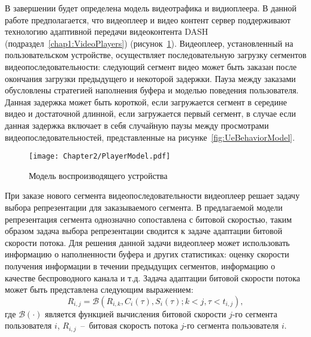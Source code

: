 В завершении будет определена модель видеотрафика и видиоплеера. В данной работе предполагается, что видеоплеер и видео контент сервер поддерживают технологию адаптивной передачи видеоконтента DASH (подраздел~\ref{chap1:VideoPlayers}) (рисунок~\ref{fig:PlayerModel}). Видеоплеер, установленный на пользовательском устройстве, осуществляет последовательную загрузку сегментов видеопоследовательности: следующий сегмент видео может быть заказан после окончания загрузки предыдущего и некоторой задержки. Пауза между заказами обусловлены стратегией наполнения буфера и моделью поведения пользователя. Данная задержка может быть короткой, если загружается сегмент в середине видео и достаточной длинной, если загружается первый сегмент, в случае если данная задержка включает в себя случайную паузы между просмотрами видеопоследовательностей, представленные на рисунке~\ref{fig:UeBehaviorModel}.

\begin{figure}[htbp]
\begin{center}
\texttt{[image: Chapter2/PlayerModel.pdf]}
\caption{Модель воспроизводящего устройства}
\label{fig:PlayerModel}
\end{center}
\end{figure}

При заказе нового сегмента видеопоследовательности видеоплеер решает задачу выбора репрезентации для заказываемого сегмента. В предлагаемой модели репрезентация сегмента однозначно сопоставлена с битовой скоростью, таким образом задача выбора репрезентации сводится к задаче адаптации битовой скорости потока. Для решения данной задачи видеоплеер может использовать информацию о наполненности буфера и других статистиках: оценку скорости получения информации в течении предыдущих сегментов, информацию о качестве беспроводного канала и т.д. Задача адаптации битовой скорости потока может быть представлена следующим выражением:
\begin{equation}
\nonumber
R_{i,j} = \mathcal{B}\left(R_{i,k}, C_i(\tau), S_i(\tau); k < j, \tau<t_{i,j} \right),
\end{equation}
где $\mathcal{B}\left(\cdot\right)$ является функцией вычисления битовой скорости $j$-го сегмента пользователя $i$, $R_{i,j}$~--~битовая скорость потока $j$-го сегмента пользователя $i$.

